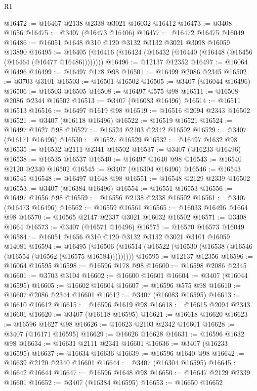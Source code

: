 \begin{lexlean}{R1}
\begin{coremodule}
@16472 := @16467 @2138 @2338 @3021 @16032 @16412
@16473 := @3408 @1656
@16475 := @3407 (@16473 @16406)
@16477 := @16472 @16475 @16049
@16486 := @16051 @1648 @310 @120 @3132 @3132 @3021 @3098 @16059 @13890
@16495 := @16405 (@16416 (@16424 (@16432 (@16440 (@16448 (@16456 (@16464 (@16477 @16486))))))))
@16496 := @12137 @12352
@16497 := @16064 @16496
@16499 := @16497 @178 @98
@16501 := @16499 @2086 @2345
@16502 := @3703 @3101
@16503 := @16501 @16502
@16505 := @3407 (@16044 @16496)
@16506 := @16503 @16505
@16508 := @16497 @575 @98
@16511 := @16508 @2086 @2344 @16502
@16513 := @3407 (@16083 @16496)
@16514 := @16511 @16513
@16516 := @16497 @1619 @98
@16519 := @16516 @2094 @2343 @16502
@16521 := @3407 (@16118 @16496)
@16522 := @16519 @16521
@16524 := @16497 @1627 @98
@16527 := @16524 @2103 @2342 @16502
@16529 := @3407 (@16171 @16496)
@16530 := @16527 @16529
@16532 := @16497 @1632 @98
@16535 := @16532 @2111 @2341 @16502
@16537 := @3407 (@16233 @16496)
@16538 := @16535 @16537
@16540 := @16497 @1640 @98
@16543 := @16540 @2120 @2340 @16502
@16545 := @3407 (@16304 @16496)
@16546 := @16543 @16545
@16548 := @16497 @1648 @98
@16551 := @16548 @2129 @2339 @16502
@16553 := @3407 (@16384 @16496)
@16554 := @16551 @16553
@16556 := @16497 @1656 @98
@16559 := @16556 @2138 @2338 @16502
@16561 := @3407 (@16473 @16496)
@16562 := @16559 @16561
@16565 := @16033 @16496 @1664 @98
@16570 := @16565 @2147 @2337 @3021 @16032 @16502
@16571 := @3408 @1664
@16573 := @3407 (@16571 @16496)
@16575 := @16570 @16573 @16049
@16584 := @16051 @1656 @310 @120 @3132 @3132 @3021 @3101 @16059 @14081
@16594 := @16495
    (@16506 (@16514 (@16522 (@16530 (@16538 (@16546 (@16554 (@16562 (@16575 @16584)))))))))
@16595 := @12137 @12356
@16596 := @16064 @16595
@16598 := @16596 @178 @98
@16600 := @16598 @2086 @2345
@16601 := @3703 @3104
@16602 := @16600 @16601
@16604 := @3407 (@16044 @16595)
@16605 := @16602 @16604
@16607 := @16596 @575 @98
@16610 := @16607 @2086 @2344 @16601
@16612 := @3407 (@16083 @16595)
@16613 := @16610 @16612
@16615 := @16596 @1619 @98
@16618 := @16615 @2094 @2343 @16601
@16620 := @3407 (@16118 @16595)
@16621 := @16618 @16620
@16623 := @16596 @1627 @98
@16626 := @16623 @2103 @2342 @16601
@16628 := @3407 (@16171 @16595)
@16629 := @16626 @16628
@16631 := @16596 @1632 @98
@16634 := @16631 @2111 @2341 @16601
@16636 := @3407 (@16233 @16595)
@16637 := @16634 @16636
@16639 := @16596 @1640 @98
@16642 := @16639 @2120 @2340 @16601
@16644 := @3407 (@16304 @16595)
@16645 := @16642 @16644
@16647 := @16596 @1648 @98
@16650 := @16647 @2129 @2339 @16601
@16652 := @3407 (@16384 @16595)
@16653 := @16650 @16652

\end{coremodule}
\end{lexlean}
